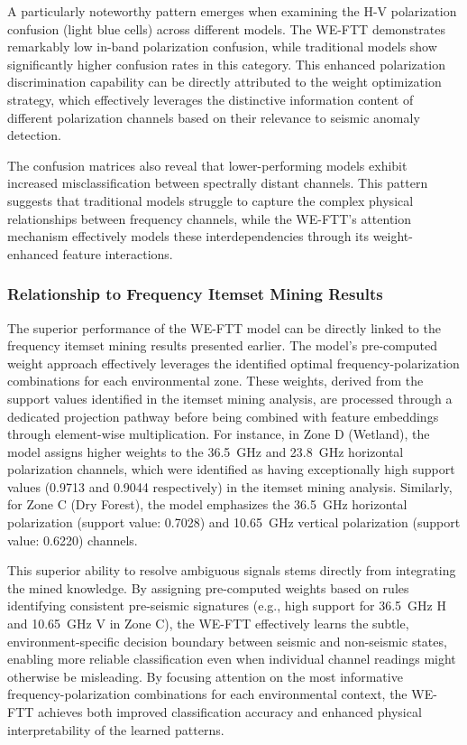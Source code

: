 \documentclass[preprint,review,12pt,authoryear]{elsarticle}
\begin{document}
A particularly noteworthy pattern emerges when examining the H-V polarization confusion (light blue cells) across different models. The WE-FTT demonstrates remarkably low in-band polarization confusion, while traditional models show significantly higher confusion rates in this category. This enhanced polarization discrimination capability can be directly attributed to the weight optimization strategy, which effectively leverages the distinctive information content of different polarization channels based on their relevance to seismic anomaly detection.

The confusion matrices also reveal that lower-performing models exhibit increased misclassification between spectrally distant channels. This pattern suggests that traditional models struggle to capture the complex physical relationships between frequency channels, while the WE-FTT's attention mechanism effectively models these interdependencies through its weight-enhanced feature interactions.

\subsubsection{Relationship to Frequency Itemset Mining Results}
The superior performance of the WE-FTT model can be directly linked to the frequency itemset mining results presented earlier. The model's pre-computed weight approach effectively leverages the identified optimal frequency-polarization combinations for each environmental zone. These weights, derived from the support values identified in the itemset mining analysis, are processed through a dedicated projection pathway before being combined with feature embeddings through element-wise multiplication. For instance, in Zone D (Wetland), the model assigns higher weights to the 36.5~GHz and 23.8~GHz horizontal polarization channels, which were identified as having exceptionally high support values (0.9713 and 0.9044 respectively) in the itemset mining analysis. Similarly, for Zone C (Dry Forest), the model emphasizes the 36.5~GHz horizontal polarization (support value: 0.7028) and 10.65~GHz vertical polarization (support value: 0.6220) channels.

This superior ability to resolve ambiguous signals stems directly from integrating the mined knowledge. By assigning pre-computed weights based on rules identifying consistent pre-seismic signatures (e.g., high support for 36.5~GHz H and 10.65~GHz V in Zone C), the WE-FTT effectively learns the subtle, environment-specific decision boundary between seismic and non-seismic states, enabling more reliable classification even when individual channel readings might otherwise be misleading. By focusing attention on the most informative frequency-polarization combinations for each environmental context, the WE-FTT achieves both improved classification accuracy and enhanced physical interpretability of the learned patterns.
\end{document}
